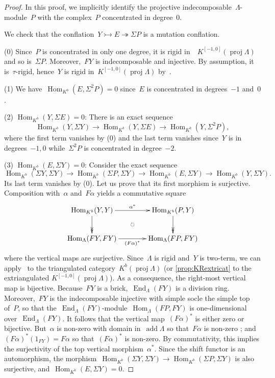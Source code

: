 \documentclass{amsart}
\theoremstyle{definition}
\newcommand{\Hom}[1]{\operatorname{Hom}_{#1}}
\newcommand{\susp}{\Sigma}
\newcommand{\add}{\operatorname{add}}
\newcommand{\End}[1]{\operatorname{End}_{#1}}
\newcommand{\proj}{\operatorname{proj}}
\newcommand{\infl}{\rightarrowtail}
\newcommand{\defl}{\twoheadrightarrow}
\begin{document}
\begin{proof}
In this proof, we implicitly identify the projective indecomposable~$\Lambda$-module~$P$ with the complex~$P$ concentrated in degree~$0$.

We check that the conflation~$Y\infl E\defl\susp P$ is a mutation conflation.

(0) Since~$P$ is concentrated in only one degree, it is rigid in~~$K^{[-1,0]}(\proj\Lambda)$ and so is~$\susp P$.
Moreover,~$FY$ is indecomposable and injective.
By assumption, it is~$\tau$-rigid, hence~$Y$ is rigid in~$K^{[-1,0]}(\proj\Lambda)$ by~\cite[Lem.~3.4]{AdachiIyamaReiten}.

(1) We have~$\Hom{K^b}(E,\susp^2 P)=0$ since~$E$ is concentrated in degrees~$-1$ and~$0$.

(2) $\Hom{K^b}(Y,\susp E)=0$: There is an exact sequence
\[
\Hom{K^b}(Y,\susp Y) \to \Hom{K^b}(Y,\susp E) \to \Hom{K^b}(Y,\susp^2 P),
\]
where the first term vanishes by (0) and the last term vanishes since~$Y$ is in degrees~$-1, 0$ while~$\susp^2 P$ is concentrated in degree~$-2$.

(3) $\Hom{K^b}(E,\susp Y) = 0$: Consider the exact sequence
\[
 \Hom{K^b}(\susp Y,\susp Y) \to \Hom{K^b}(\susp P,\susp Y) \to \Hom{K^b}(E,\susp Y) \to \Hom{K^b}(Y,\susp Y).
\]
Its last term vanishes by (0).
Let us prove that its first morphism is surjective.
Composition with~$\alpha$ and~$F\alpha$ yields a commutative square
\[
\xy
%
(-20,7)*+{\Hom{K^b}(Y,Y)}="0";
(20,7)*+{\Hom{K^b}(P,Y)}="2";
(-20,-7)*+{\Hom{\Lambda}(FY,FY)}="10";
(20,-7)*+{\Hom{\Lambda}(FP,FY)}="12";
%
{\ar@{->>} "0";"10"};
{\ar^{\alpha^\ast} "0";"2"};
{\ar@{->>} "2";"12"};
{\ar_{(F\alpha)^\ast} "10";"12"};
%
{\ar@{}|\circlearrowright "0";"12"};
\endxy
\]
where the vertical maps are surjective.
Since~$\Lambda$ is rigid and~$Y$ is two-term, we can apply~\cite[Prop.~6.2]{IyamaYoshino} to the triangulated category~$K^b(\proj\Lambda)$ (or \cref{prop:KRextricat} to the extriangulated $K^{[-1,0]}(\proj\Lambda)$).
As a consequence, the right-most vertical map is bijective.
Because~$FY$ is a brick,~$\End{\Lambda}(FY)$ is a division ring.
Moreover,~$FY$ is the indecomposable injective with simple socle the simple top of~$P$, so that the~$\End{\Lambda}(FY)$-module~$\Hom{\Lambda}(FP,FY)$ is one-dimensional over~$\End{\Lambda}(FY)$.
It follows that the vertical map~$(F\alpha)^\ast$ is either zero or bijective.
But~$\alpha$ is non-zero with domain in~$\add\Lambda$ so that~$F\alpha$ is non-zero ; and~$(F\alpha)^\ast(1_{FY})=F\alpha$ so that~$(F\alpha)^\ast$ is non-zero.
By commutativity, this implies the surjectivity of the top vertical morphism~$\alpha^\ast$.
Since the shift functor is an automorphism, the morphism~$\Hom{K^b}(\susp Y,\susp Y) \to \Hom{K^b}(\susp P,\susp Y)$ is also surjective, and~$\Hom{K^b}(E,\susp Y) = 0$.


\end{proof}
\end{document}
